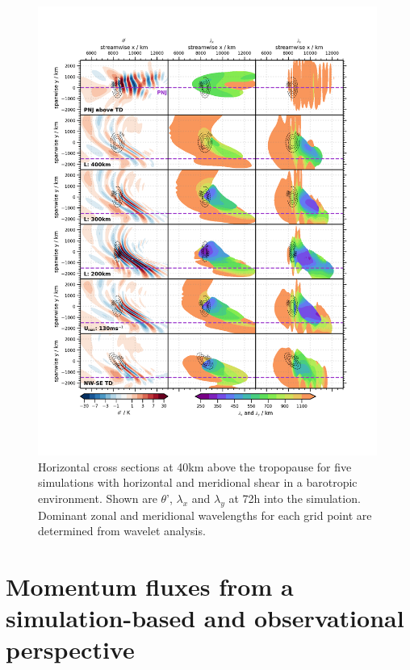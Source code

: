 \begin{figure}[tbp]
    \centering
    \includegraphics[width=0.99\textwidth]{figures_3D/waveletAna_dudy.png}
    \caption{Horizontal cross sections at 40km above the tropopause for five simulations with horizontal and meridional shear in a barotropic environment. Shown are $\theta$', $\lambda_x$ and $\lambda_y$ at 72h into the simulation. Dominant zonal and meridional wavelengths for each grid point are determined from wavelet analysis.}
\end{figure}


\section{Momentum fluxes from a simulation-based and observational perspective}

